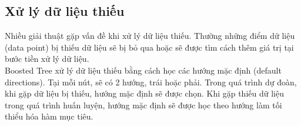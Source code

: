 \subsection{Xử lý dữ liệu thiếu}

Nhiều giải thuật gặp vấn đề khi xử lý dữ liệu thiếu. Thường những điểm dữ liệu (data point) bị thiếu dữ liệu sẽ bị bỏ qua hoặc sẽ được tìm cách thêm giá trị tại bước tiền xử lý dữ liệu. \\
Boosted Tree xử lý dữ liệu thiếu bằng cách học các hướng mặc định (default directions). Tại mỗi nút, sẽ có 2 hướng, trái hoặc phải. Trong quá trình dự đoàn, khi gặp dữ liệu bị thiếu, hướng mặc định sẽ được chọn. Khi gặp thiếu dữ liệu trong quá trình huấn luyện, hướng mặc định sẽ được học theo hướng làm tối thiểu hóa hàm mục tiêu. \cite{missing}

